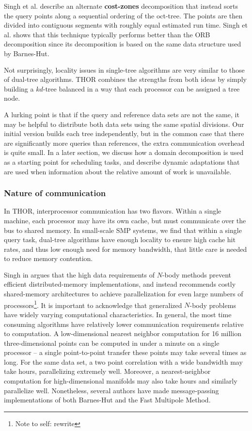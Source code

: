 \documentclass[twoside,leqno,twocolumn]{article}
\newcommand{\authornote}[1]{\footnote{Note to self: #1}}
\newcommand{\authorsnote}[1]{\authornote{#1}}
\newcommand{\mysubsub}[1]{\subsubsection{#1} }
\newcommand{\defterm}[1]{{\bf #1}}
\begin{document}
Singh et al. describe an alternate \defterm{cost-zones} decomposition\cite{singh95load} that instead sorts the query points along a sequential ordering of the oct-tree.
The points are then divided into contiguous segments with roughly equal estimated run time.
Singh et al. shows\cite{singh95load} that this technique typically performs better than the ORB decomposition since its decomposition is based on the same data structure used by Barnes-Hut.

Not surprisingly, locality issues in single-tree algorithms are very similar to those of dual-tree algorithms.
THOR combines the strengths from both ideas by simply building a $kd$-tree balanced in a way that each processor can be assigned a tree node.

A lurking point is that if the query and reference data sets are not the same, it may be helpful to distribute both data sets using the same spatial divisions.
Our initial version builds each tree independently, but in the common case that there are significantly more queries than references, the extra communication overhead is quite small.
In a later section, we discuss how a domain decomposition is used as a starting point for scheduling tasks, and describe dynamic adaptations that are used when information about the relative amount of work is unavailable.

\mysubsub{Nature of communication}

In THOR, interprocessor communication has two flavors.
Within a single machine, each processor may have its own cache, but must communicate over the bus to shared memory.
In small-scale SMP systems, we find that within a single query task, dual-tree algorithms have enough locality to ensure high cache hit rates, and thus low enough need for memory bandwidth, that little care is needed to reduce memory contention.

Singh in \cite{singh_thesis} argues that the high data requirements of $N$-body methods prevent efficient distributed-memory implementations, and instead recommends costly shared-memory architectures to achieve parallelization for even large numbers of processors\authorsnote{rewrite}.
It is important to acknowledge that generalized $N$-body problems have widely varying computational characteristics.
In general, the most time consuming algorithms have relatively lower communication requirements relative to computation.
A low-dimensional nearest neighbor computation for 16 million three-dimensional points can be computed in under a minute on a single processor -- a single point-to-point transfer these points may take several times as long.
For the same data set, a two point correlation with a wide bandwidth may take hours, parallelizing extremely well.
Moreover, a nearest-neighbor computation for high-dimensional manifolds may also take hours and similarly parallelize well.
Nonetheless, several authors \cite{salmon_thesis, liu94experiences, salmon97parallel} have made message-passing implementations of both Barnes-Hut and the Fast Multipole Method.
\end{document}
